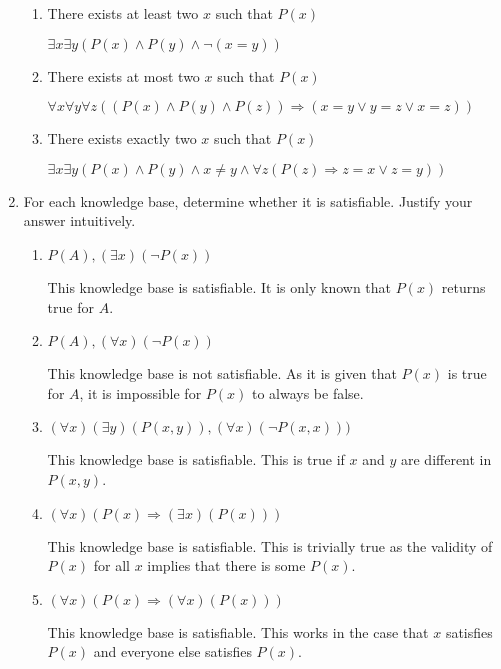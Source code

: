 \documentclass[12pt]{article}
\begin{document}
\begin{enumerate}
\begin{enumerate}
			\item There exists at least two $x$ such that $P(x)$

			$\exists x \exists y (P(x) \land P(y) \land \neg (x = y))$

			\item There exists at most two $x$ such that $P(x)$

			$\forall x \forall y \forall z ((P(x) \land P(y) \land P(z)) \Rightarrow (x = y \lor y = z \lor x = z))$

			\item There exists exactly two $x$ such that $P(x)$

			$\exists x \exists y (P(x) \land P(y) \land x \neq y \land \forall z (P(z) \Rightarrow z = x \lor z = y))$
		\end{enumerate}

	\item For each knowledge base, determine whether it is satisfiable. Justify your answer intuitively.

		\begin{enumerate}
			\item $P(A), (\exists x) (\neg P(x))$

			This knowledge base is satisfiable. It is only known that $P(x)$ returns true for $A$.

			\item $P(A), (\forall x) (\neg P(x))$

			This knowledge base is not satisfiable. As it is given that $P(x)$ is true for $A$, it is impossible for $P(x)$ to always be false.

			\item $(\forall x)(\exists y)(P(x, y)), (\forall x)(\neg P(x, x)))$

			This knowledge base is satisfiable. This is true if $x$ and $y$ are different in $P(x, y)$.

			\item $(\forall x)(P(x) \Rightarrow (\exists x)(P(x)))$

			This knowledge base is satisfiable. This is trivially true as the validity of $P(x)$ for all $x$ implies that there is some $P(x)$.

			\item $(\forall x)(P(x) \Rightarrow (\forall x)(P(x)))$

			This knowledge base is satisfiable. This works in the case that $x$ satisfies $P(x)$ and everyone else satisfies $P(x)$.

		\end{enumerate}


\end{enumerate}
\end{document}
